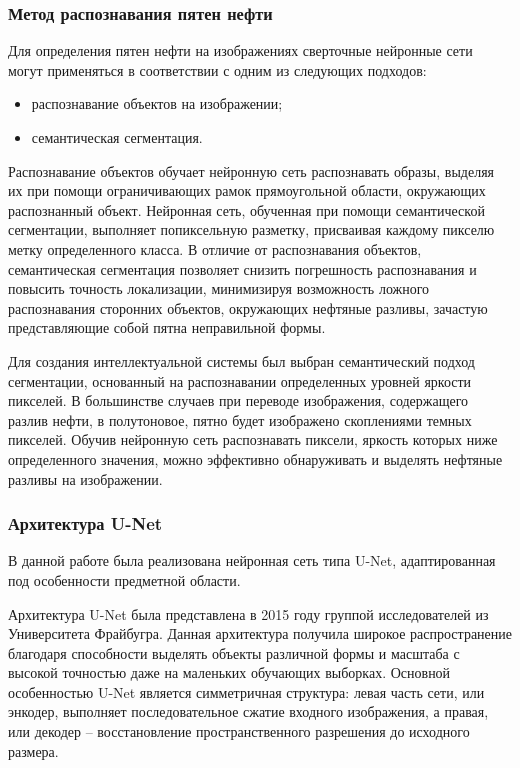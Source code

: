 \subsubsection{Метод распознавания пятен нефти}

Для определения пятен нефти на изображениях сверточные нейронные сети могут применяться в соответствии с одним из следующих подходов:

\begin{itemize}
	\item распознавание объектов на изображении;
	\item семантическая сегментация.
\end{itemize}

Распознавание объектов обучает нейронную сеть распознавать образы, выделяя их при помощи ограничивающих рамок прямоугольной области, окружающих распознанный объект. Нейронная сеть, обученная при помощи семантической сегментации, выполняет попиксельную разметку, присваивая каждому пикселю метку определенного класса. В отличие от распознавания объектов, семантическая сегментация позволяет снизить погрешность распознавания и повысить точность локализации, минимизируя возможность ложного распознавания сторонних объектов, окружающих нефтяные разливы, зачастую представляющие собой пятна неправильной формы.

Для создания интеллектуальной системы был выбран семантический подход сегментации, основанный на распознавании определенных уровней яркости пикселей. В большинстве случаев при переводе изображения, содержащего разлив нефти, в полутоновое, пятно будет изображено скоплениями темных пикселей. Обучив нейронную сеть распознавать пиксели, яркость которых ниже определенного значения, можно эффективно обнаруживать и выделять нефтяные разливы на изображении.

\subsubsection{Архитектура U-Net}

В данной работе была реализована нейронная сеть типа U-Net, адаптированная под особенности предметной области. 

Архитектура U-Net была представлена в 2015 году группой исследователей из Университета Фрайбугра. Данная архитектура получила широкое распространение благодаря способности выделять объекты различной формы и масштаба с высокой точностью даже на маленьких обучающих выборках. Основной особенностью U-Net является симметричная структура: левая часть сети, или энкодер, выполняет последовательное сжатие входного изображения, а правая, или декодер -- восстановление пространственного разрешения до исходного размера.

